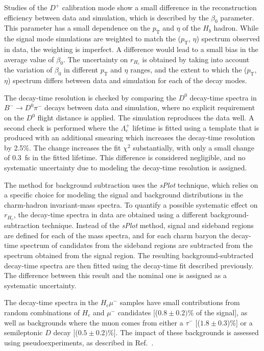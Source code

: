 \documentclass[12pt,a4paper]{article}
\def\Pmu         {\ensuremath{\upmu}\xspace}
\def\Ppi         {\ensuremath{\uppi}\xspace}
\def\Ptau        {\ensuremath{\uptau}\xspace}
\def\PLambda     {\ensuremath{\Lambda}\xspace}
\def\PB      {\ensuremath{\mathrm{B}}\xspace}
\def\PD      {\ensuremath{\mathrm{D}}\xspace}
\def\Pc      {\ensuremath{\mathrm{c}}\xspace}
\def\Pmu         {\ensuremath{\mu}\xspace}
\def\Ppi         {\ensuremath{\pi}\xspace}
\def\Ptau        {\ensuremath{\tau}\xspace}
\def\PB      {\ensuremath{B}\xspace}
\def\PD      {\ensuremath{D}\xspace}
\def\Pc      {\ensuremath{c}\xspace}
\def\mun        {{\ensuremath{\Pmu^-}}\xspace} \def\mupm       {{\ensuremath{\Pmu^\pm}}\xspace}
\def\taum       {{\ensuremath{\Ptau^-}}\xspace}
\def\cquark    {{\ensuremath{\Pc}}\xspace}
\def\pion   {{\ensuremath{\Ppi}}\xspace}
\def\pim    {{\ensuremath{\pion^-}}\xspace}
\def\D       {{\ensuremath{\PD}}\xspace}
\def\Dz      {{\ensuremath{\D^0}}\xspace}
\def\Dp      {{\ensuremath{\D^+}}\xspace}
\def\B       {{\ensuremath{\PB}}\xspace}
\def\Bub     {{\ensuremath{\B^-}}\xspace}
\def\Bm      {{\ensuremath{\Bub}}\xspace}
\def\Lz          {{\ensuremath{\PLambda}}\xspace}
\def\Lc          {{\ensuremath{\Lz^+_\cquark}}\xspace}
\def\to                 {\ensuremath{\rightarrow}\xspace}
\newcommand{\chisq}{\ensuremath{\chi^2}\xspace}
\def\sPlot{\mbox{\em sPlot}\xspace}
\def\pt         {\ensuremath{p_{\mathrm{T}}}\xspace}
\begin{document}
Studies of the $\Dp$ calibration mode show a small difference in the reconstruction efficiency between data and simulation,
which is described by the $\beta_0$ parameter. This parameter has a small dependence on the $\pt$ and $\eta$ of the $H_b$ hadron. 
While the signal mode simulations are weighted to match the ($\pt$, $\eta$) spectrum observed in data, the weighting is imperfect.
A difference would lead to a small bias in the average value of $\beta_0$. 
The uncertainty on $r_{H_c}$ is obtained by taking into account the variation of $\beta_0$ in different 
$\pt$ and $\eta$ ranges, and the extent to which the ($\pt$, $\eta$) spectrum differs between data and simulation
for each of the decay modes.

The decay-time resolution is checked by comparing the $\Dz$ decay-time spectra in
$\Bm\to\Dz\pim$ decays between data and simulation, where no explicit requirement on the $\Dz$ flight distance is applied.
The simulation reproduces the data well. A second check is performed where the $\Lc$ lifetime 
is fitted using a template that is produced with an additional smearing which increases the decay-time resolution by 2.5\%. 
The change increases the fit $\chisq$ substantially,
with only a small change of 0.3~fs in the fitted lifetime. This difference is considered negligible, and no systematic
uncertainty due to modeling the decay-time resolution is assigned.

The method for background subtraction uses the \sPlot technique, which relies on a specific choice for modeling the 
signal and background distributions in the charm-hadron invariant-mass spectra. To quantify a possible systematic effect on $r_{H_c}$,
the decay-time spectra in data are obtained using a different background-subtraction technique. Instead of the \sPlot method,
signal and sideband regions are defined for each of the mass spectra, and for each charm baryon the decay-time spectrum of candidates
from the sideband regions are subtracted from the spectrum obtained from the signal region. The resulting background-subtracted
decay-time spectra are then fitted using the decay-time fit described previously. The difference between this result and the nominal 
one is assigned as a systematic uncertainty. 

The decay-time spectra in the $H_c\mun$ samples have small contributions from random combinations of
$H_c$ and $\mun$ candidates [($0.8\pm0.2)$\% of the signal], as well as backgrounds where the muon 
comes from either a $\taum$ [($1.8\pm0.3$)\%] or a semileptonic $D$ decay [($0.5\pm0.2)$\%]. The impact of these 
backgrounds is assessed using pseudoexperiments, as described in Ref.~\cite{LHCb-PAPER-2018-028}.
\end{document}
